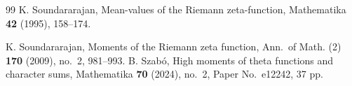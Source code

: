 \documentclass[twoside,reqno,11pt,a4paper]{amsart}
\numberwithin{equation}{section}
\theoremstyle{plain}
\theoremstyle{definition}
\theoremstyle{remark}
\begin{document}
\begin{thebibliography}{99}
        		 K. Soundararajan, Mean-values of the Riemann zeta-function, Mathematika \textbf{42} (1995), 158--174.
                
		 K. Soundararajan, Moments of the Riemann zeta function, Ann.\ of Math. (2) \textbf{170} (2009), no.~2, 981--993.
		 B. Szab\'o, High moments of theta functions and character sums, Mathematika \textbf{70} (2024), no.~2, Paper No.\ e12242, 37 pp.
	\end{thebibliography}
\end{document}

